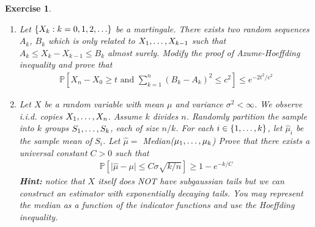 \documentclass[12pt]{article}
\theoremstyle{colon}
\newtheorem{exercise}{Exercise}
\begin{document}
\clearpage

\begin{exercise}
  \leavevmode
  \begin{enumerate}[label=\arabic*)]
    \item Let $\{X_k : k = 0, 1, 2, \mathellipsis \}$ be a martingale. There exists two random sequences $A_k$, $B_k$ which is only related to $X_1, \mathellipsis, X_{k-1}$ such that $A_k \leq X_k - X_{k-1} \leq B_k$ almost surely. Modify the proof of Azume-Hoeffding inequality and prove that
      \begin{gather*}
        \mathbb{P} \left[ X_n - X_0 \geq t \text{ and } \sum_{k=1}^n (B_k - A_k)^2 \leq c^2 \right] \leq e^{-2 t^2/c^2}
      \end{gather*}

    \item Let $X$ be a random variable with mean $\mu$ and variance $\sigma^2 < \infty$. We observe i.i.d. copies $X_1, \mathellipsis, X_n$. Assume $k$ divides $n$. Randomly partition the sample into $k$ groups $S_1, \mathellipsis, S_k$, each of size $n/k$. For each $i \in \{1, \mathellipsis, k\}$, let $\hat{\mu}_i$ be the sample mean of $S_i$. Let $\hat{\mu} = $ Median($\mu_1, \mathellipsis, \mu_k$) Prove that there exists a universal constant $C > 0$ such that
      \begin{gather*}
        \mathbb{P} [ \lvert \hat{\mu} - \mu \rvert \leq C \sigma \sqrt{k/n} ] \geq 1 - e^{-k/C}
      \end{gather*}
      \textbf{Hint:} notice that $X$ itself does NOT have subgaussian tails but we can construct an estimator with exponentially decaying tails. You may represent the median as a function of the indicator functions and use the Hoeffding inequality.
  \end{enumerate}
\end{exercise}
\end{document}
